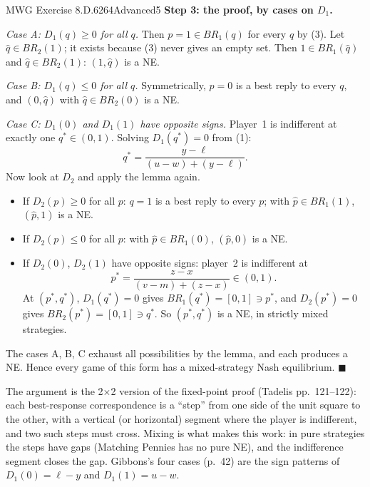 \begin{exsol}{MWG Exercise 8.D.6}{264}{Advanced}{5}
\textbf{Step 3: the proof, by cases on $D_1$.}

\emph{Case A: $D_1(q) \ge 0$ for all $q$.} Then $p = 1 \in BR_1(q)$ for every $q$ by (3). Let
$\hat q \in BR_2(1)$; it exists because (3) never gives an empty set. Then $1 \in BR_1(\hat q)$
and $\hat q \in BR_2(1)$: $(1, \hat q)$ is a NE.

\emph{Case B: $D_1(q) \le 0$ for all $q$.} Symmetrically, $p = 0$ is a best reply to every $q$,
and $(0, \hat q)$ with $\hat q \in BR_2(0)$ is a NE.

\emph{Case C: $D_1(0)$ and $D_1(1)$ have opposite signs.} Player~1 is indifferent at exactly one
$q^* \in (0,1)$. Solving $D_1(q^*) = 0$ from (1):
\[
  q^* = \frac{y - \ell}{(u - w) + (y - \ell)} . \tag{4}
\]
Now look at $D_2$ and apply the lemma again.
\begin{itemize}
  \item If $D_2(p) \ge 0$ for all $p$: $q = 1$ is a best reply to every $p$; with
  $\hat p \in BR_1(1)$, $(\hat p, 1)$ is a NE.
  \item If $D_2(p) \le 0$ for all $p$: with $\hat p \in BR_1(0)$, $(\hat p, 0)$ is a NE.
  \item If $D_2(0)$, $D_2(1)$ have opposite signs: player~2 is indifferent at
  \[
    p^* = \frac{z - x}{(v - m) + (z - x)} \in (0,1). \tag{5}
  \]
  At $(p^*, q^*)$, $D_1(q^*) = 0$ gives $BR_1(q^*) = [0,1] \ni p^*$, and $D_2(p^*) = 0$ gives
  $BR_2(p^*) = [0,1] \ni q^*$. So $(p^*, q^*)$ is a NE, in strictly mixed strategies.
\end{itemize}
The cases A, B, C exhaust all possibilities by the lemma, and each produces a NE. Hence every game
of this form has a mixed-strategy Nash equilibrium. $\blacksquare$

\interp The argument is the 2$\times$2 version of the fixed-point proof (Tadelis
pp.~121--122): each best-response correspondence is a ``step'' from one side of the unit square to
the other, with a vertical (or horizontal) segment where the player is indifferent, and two such
steps must cross. Mixing is what makes this work: in pure strategies the steps have gaps (Matching
Pennies has no pure NE), and the indifference segment closes the gap. Gibbons's four cases
(p.~42) are the sign patterns of $D_1(0) = \ell - y$ and $D_1(1) = u - w$.


\end{exsol}
